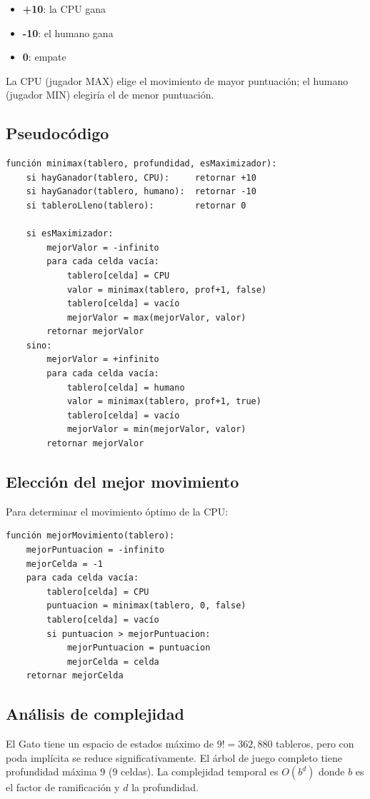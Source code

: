 \documentclass[12pt,a4paper]{article}
\begin{document}
\begin{itemize}
  \item \textbf{+10}: la CPU gana
  \item \textbf{-10}: el humano gana
  \item \textbf{0}: empate
\end{itemize}

La CPU (jugador MAX) elige el movimiento de mayor puntuación; el humano (jugador MIN) elegiría el de menor puntuación.

\subsection{Pseudocódigo}
\begin{lstlisting}
función minimax(tablero, profundidad, esMaximizador):
    si hayGanador(tablero, CPU):     retornar +10
    si hayGanador(tablero, humano):  retornar -10
    si tableroLleno(tablero):        retornar 0

    si esMaximizador:
        mejorValor = -infinito
        para cada celda vacía:
            tablero[celda] = CPU
            valor = minimax(tablero, prof+1, false)
            tablero[celda] = vacío
            mejorValor = max(mejorValor, valor)
        retornar mejorValor
    sino:
        mejorValor = +infinito
        para cada celda vacía:
            tablero[celda] = humano
            valor = minimax(tablero, prof+1, true)
            tablero[celda] = vacío
            mejorValor = min(mejorValor, valor)
        retornar mejorValor
\end{lstlisting}

\subsection{Elección del mejor movimiento}
Para determinar el movimiento óptimo de la CPU:

\begin{lstlisting}
función mejorMovimiento(tablero):
    mejorPuntuacion = -infinito
    mejorCelda = -1
    para cada celda vacía:
        tablero[celda] = CPU
        puntuacion = minimax(tablero, 0, false)
        tablero[celda] = vacío
        si puntuacion > mejorPuntuacion:
            mejorPuntuacion = puntuacion
            mejorCelda = celda
    retornar mejorCelda
\end{lstlisting}

\subsection{Análisis de complejidad}
El Gato tiene un espacio de estados máximo de $9! = 362{,}880$ tableros, pero con poda implícita se reduce significativamente. El árbol de juego completo tiene profundidad máxima 9 (9 celdas). La complejidad temporal es $O(b^d)$ donde $b$ es el factor de ramificación y $d$ la profundidad.
\end{document}
